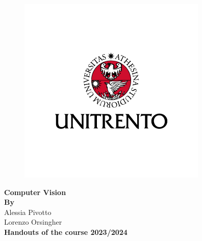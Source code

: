 \begin{titlepage}
   \begin{figure}
          \centering
          \includegraphics[scale=1]{Figures/Logo.png}
      \end{figure}
      \begin{center}
   
          \textbf{\LARGE Computer Vision}
           \vspace{1.5cm} \\
           
          \textbf{\textbf{By}} \\Alessia Pivotto \\ Lorenzo Orsingher \\
          
   
   \textbf{Handouts of the course 2023/2024}\\      
   \vspace{0.5cm}
           
      \end{center}
   \end{titlepage}